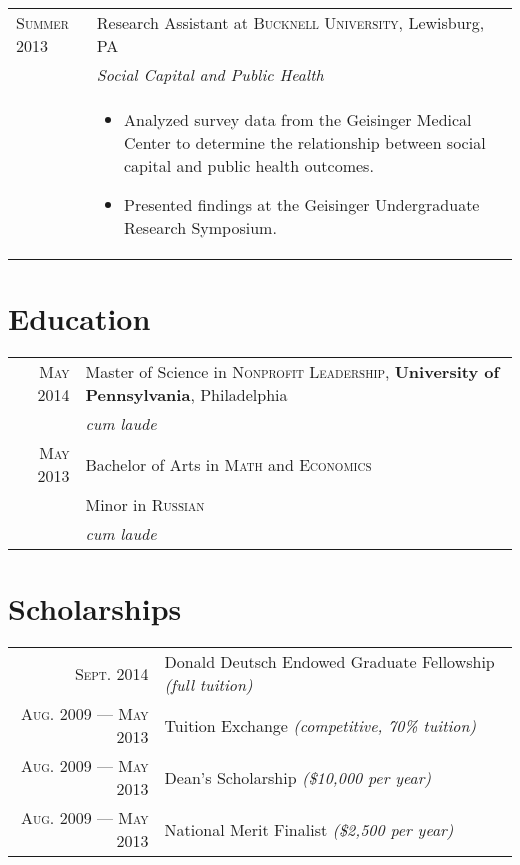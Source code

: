 \documentclass[a4paper,10pt]{article}
\begin{document}
\begin{longtable}{p{} | p{} |}
  \textsc{Summer 2013} & Research Assistant at \textsc{Bucknell University}, Lewisburg, PA \\ 
    &\emph{Social Capital and Public Health}\\ 
    &\footnotesize{ 
    \begin{itemize}
      \item Analyzed survey data from the Geisinger Medical Center to determine the relationship between social capital and public health outcomes. 
      \item Presented findings at the Geisinger Undergraduate Research Symposium.
      \end{itemize}
    }
\end{longtable}

\section{Education} 
  \begin{tabular}{rp{10cm}}	 
    \textsc{May} 2014 & Master of Science in \textsc{Nonprofit Leadership}, \textbf{University of Pennsylvania}, Philadelphia\\  
      & \small\emph{cum laude}\\ 
    \textsc{May} 2013 & Bachelor of Arts in \textsc{Math} and \textsc{Economics} \\ 
      & Minor in \textsc{Russian} \\ 
      & \small\emph{cum laude}\\
\end{tabular}

\section{Scholarships} 
  \begin{tabular}{rl} 
    \textsc{Sept.} 2014 & Donald Deutsch Endowed Graduate Fellowship \small\emph{(full tuition)}\\ \textsc{Aug.} 2009 --- \textsc{May} 2013 & Tuition Exchange \small\emph{(competitive, 70\% tuition)}\\ 
    \textsc{Aug.} 2009 --- \textsc{May} 2013 & Dean's Scholarship \small\emph{(\$10,000 per year)}\\ 
    \textsc{Aug.} 2009 --- \textsc{May} 2013 & National Merit Finalist \small\emph{(\$2,500 per year)}\\
\end{tabular}
\end{document}
